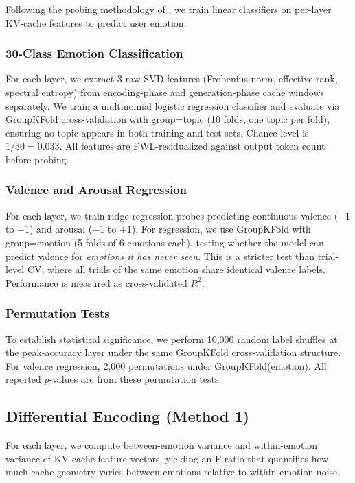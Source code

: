 \documentclass[11pt,a4paper]{article}
\begin{document}
Following the probing methodology of \citet{belinkov2022probing}, we train linear classifiers on per-layer KV-cache features to predict user emotion.

\subsubsection{30-Class Emotion Classification}

For each layer, we extract 3 raw SVD features (Frobenius norm, effective rank, spectral entropy) from encoding-phase and generation-phase cache windows separately. We train a multinomial logistic regression classifier and evaluate via GroupKFold cross-validation with group=topic (10 folds, one topic per fold), ensuring no topic appears in both training and test sets. Chance level is $1/30 = 0.033$. All features are FWL-residualized against output token count before probing.

\subsubsection{Valence and Arousal Regression}

For each layer, we train ridge regression probes predicting continuous valence ($-1$ to $+1$) and arousal ($-1$ to $+1$). For regression, we use GroupKFold with group=emotion (5 folds of 6 emotions each), testing whether the model can predict valence for \emph{emotions it has never seen}. This is a stricter test than trial-level CV, where all trials of the same emotion share identical valence labels. Performance is measured as cross-validated $R^2$.

\subsubsection{Permutation Tests}

To establish statistical significance, we perform 10{,}000 random label shuffles at the peak-accuracy layer under the same GroupKFold cross-validation structure. For valence regression, 2{,}000 permutations under GroupKFold(emotion). All reported $p$-values are from these permutation tests.

\subsection{Differential Encoding (Method 1)}

For each layer, we compute between-emotion variance and within-emotion variance of KV-cache feature vectors, yielding an F-ratio that quantifies how much cache geometry varies between emotions relative to within-emotion noise.
\end{document}
